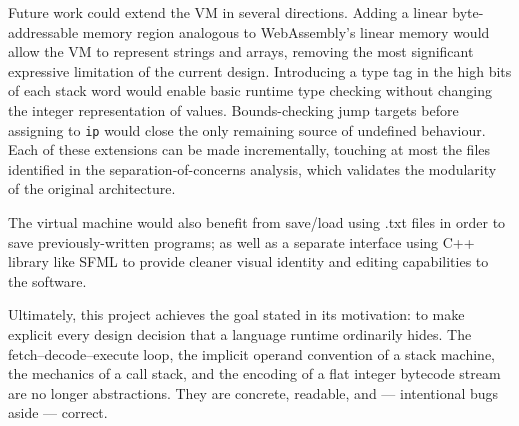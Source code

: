 Future work could extend the VM in several directions. Adding a linear 
byte-addressable memory region analogous to WebAssembly's linear memory 
would allow the VM to represent strings and arrays, removing the most 
significant expressive limitation of the current design. Introducing a type tag 
in the high bits of each stack word would enable basic runtime type checking 
without changing the integer representation of values. Bounds-checking jump 
targets before assigning to \texttt{ip} would close the only remaining source 
of undefined behaviour. Each of these extensions can be made incrementally, 
touching at most the files identified in the separation-of-concerns analysis, 
which validates the modularity of the original architecture.

The virtual machine would also benefit from save/load using .txt files in order to save
previously-written programs; as well as a separate interface using C++ library like SFML
to provide cleaner visual identity and editing capabilities to the software.

Ultimately, this project achieves the goal stated in its motivation: to make 
explicit every design decision that a language runtime ordinarily hides. The 
fetch–decode–execute loop, the implicit operand convention of a stack machine, 
the mechanics of a call stack, and the encoding of a flat integer bytecode 
stream are no longer abstractions. They are concrete, readable, and — 
intentional bugs aside — correct.